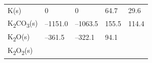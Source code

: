 \documentclass[
  9pt,
]{extbook}
\theoremstyle{definition}
\theoremstyle{definition}
\theoremstyle{definition}
\theoremstyle{remark}
\begin{document}
\begin{longtable}[]{@{}lllll@{}}
\begin{minipage}[t]{0.10\columnwidth}\raggedright
K(s)\strut
\end{minipage} & \begin{minipage}[t]{0.19\columnwidth}\raggedright
0\strut
\end{minipage} & \begin{minipage}[t]{0.20\columnwidth}\raggedright
0\strut
\end{minipage} & \begin{minipage}[t]{0.18\columnwidth}\raggedright
64.7\strut
\end{minipage} & \begin{minipage}[t]{0.18\columnwidth}\raggedright
29.6\strut
\end{minipage}\tabularnewline
\begin{minipage}[t]{0.10\columnwidth}\raggedright
K\textsubscript{2}CO\textsubscript{3}(s)\strut
\end{minipage} & \begin{minipage}[t]{0.19\columnwidth}\raggedright
--1151.0\strut
\end{minipage} & \begin{minipage}[t]{0.20\columnwidth}\raggedright
--1063.5\strut
\end{minipage} & \begin{minipage}[t]{0.18\columnwidth}\raggedright
155.5\strut
\end{minipage} & \begin{minipage}[t]{0.18\columnwidth}\raggedright
114.4\strut
\end{minipage}\tabularnewline
\begin{minipage}[t]{0.10\columnwidth}\raggedright
K\textsubscript{2}O(s)\strut
\end{minipage} & \begin{minipage}[t]{0.19\columnwidth}\raggedright
--361.5\strut
\end{minipage} & \begin{minipage}[t]{0.20\columnwidth}\raggedright
--322.1\strut
\end{minipage} & \begin{minipage}[t]{0.18\columnwidth}\raggedright
94.1\strut
\end{minipage} & \begin{minipage}[t]{0.18\columnwidth}\raggedright
\strut
\end{minipage}\tabularnewline
\begin{minipage}[t]{0.10\columnwidth}\raggedright
K\textsubscript{2}O\textsubscript{2}(s)\strut

\end{minipage}
\end{longtable}
\end{document}
